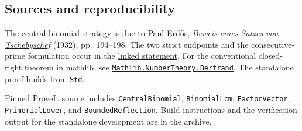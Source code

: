 \documentclass[12pt,letterpaper]{article}
\newcommand{\code}[1]{\texttt{\small #1}}
\newcommand{\repo}{https://github.com/VladimirReshetnikov/ProveIt/blob/1e53ba5b26b144afb01bf6774d75cf35f6c760b2/Logic/PrimitiveRecursiveArithmetic/Derivations/Lean/IPRADerivations}
\begin{document}
\subsection*{Sources and reproducibility}
The central-binomial strategy is due to Paul Erd\H{o}s, \href{https://www.renyi.hu/~p_erdos/1932-01.pdf}{\emph{Beweis eines Satzes von Tschebyschef}} (1932), pp.~194--198. The two strict endpoints and the consecutive-prime formulation occur in the \href{https://en.wikipedia.org/wiki/Bertrand\%27s_postulate}{linked statement}. For the conventional closed-right theorem in mathlib, see \href{https://leanprover-community.github.io/mathlib4_docs/Mathlib/NumberTheory/Bertrand.html}{\code{Mathlib.NumberTheory.Bertrand}}. The standalone proof builds from \code{Std}.

Pinned ProveIt source includes \href{\repo/Combinatorics/CentralBinomial.lean}{\code{CentralBinomial}}, \href{\repo/AnalyticNumberTheory/BinomialLcm.lean}{\code{BinomialLcm}}, \href{\repo/AnalyticNumberTheory/FactorVector.lean}{\code{FactorVector}}, \href{\repo/AnalyticNumberTheory/PrimorialLower.lean}{\code{PrimorialLower}}, and \href{\repo/Foundations/BoundedReflection.lean}{\code{BoundedReflection}}. Build instructions and the verification output for the standalone development are in the archive.
\end{document}
